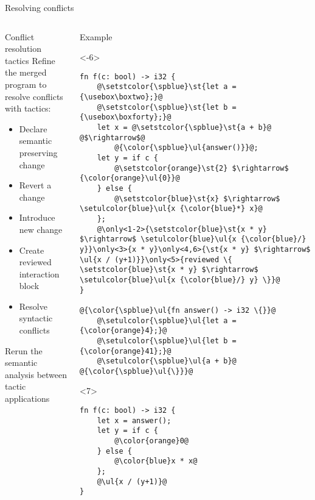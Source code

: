 \documentclass{beamer}
\makeatletter
\let\UL\ul
\renewcommand\ul{%
  \let\set@color\beamerorig@set@color
  \let\reset@color\beamerorig@reset@color
  \UL}
\let\ST\st
\renewcommand\st{%
  \let\set@color\beamerorig@set@color
  \let\reset@color\beamerorig@reset@color
  \ST}
\makeatother
\begin{document}
\begin{frame}[fragile]{Resolving conflicts}
\begin{columns}
\begin{column}{0.48\textwidth}
\begin{block}{Conflict resolution tactics}
Refine the merged program to resolve conflicts with tactics:
\begin{itemize}
 \item<2-> Declare semantic preserving change
 \item<3-> Revert a change
 \item<4-> Introduce new change
 \item<5-> Create reviewed interaction block
 \item<6-> Resolve syntactic conflicts
\end{itemize}

Rerun the semantic analysis between tactic applications
\end{block}
\end{column}
\begin{column}{0.48\textwidth}
\begin{exampleblock}{Example}
\begin{onlyenv}<-6>
\newbox\boxtwo
\sbox\boxtwo{\setulcolor{orange}\setul{-.75ex}{}\ul{\scriptsize\ttfamily 2}}
\newbox\boxforty
\sbox\boxforty{\setulcolor{orange}\setul{-.75ex}{}\ul{\scriptsize\ttfamily 40}}
\begin{lstlisting}
fn f(c: bool) -> i32 {
    @\setstcolor{\spblue}\st{let a = {\usebox\boxtwo};}@
    @\setstcolor{\spblue}\st{let b = {\usebox\boxforty};}@
    let x = @\setstcolor{\spblue}\st{a + b}@ @$\rightarrow$@
        @{\color{\spblue}\ul{answer()}}@;
    let y = if c {
        @\setstcolor{orange}\st{2} $\rightarrow$ {\color{orange}\ul{0}}@
    } else {
        @\setstcolor{blue}\st{x} $\rightarrow$ \setulcolor{blue}\ul{x {\color{blue}*} x}@
    };
    @\only<1-2>{\setstcolor{blue}\st{x * y} $\rightarrow$ \setulcolor{blue}\ul{x {\color{blue}/} y}}\only<3>{x * y}\only<4,6>{\st{x * y} $\rightarrow$ \ul{x / (y+1)}}\only<5>{reviewed \{ \setstcolor{blue}\st{x * y} $\rightarrow$ \setulcolor{blue}\ul{x {\color{blue}/} y} \}}@
}

@{\color{\spblue}\ul{fn answer() -> i32 \{}}@
    @\setulcolor{\spblue}\ul{let a = {\color{orange}4};}@
    @\setulcolor{\spblue}\ul{let b = {\color{orange}41};}@
    @\setulcolor{\spblue}\ul{a + b}@
@{\color{\spblue}\ul{\}}}@
\end{lstlisting}
\end{onlyenv}
\begin{onlyenv}<7>
\begin{lstlisting}
fn f(c: bool) -> i32 {
    let x = answer();
    let y = if c {
        @\color{orange}0@
    } else {
        @\color{blue}x * x@
    };
    @\ul{x / (y+1)}@
}


\end{lstlisting}
\end{onlyenv}
\end{exampleblock}
\end{column}
\end{columns}
\end{frame}
\end{document}
